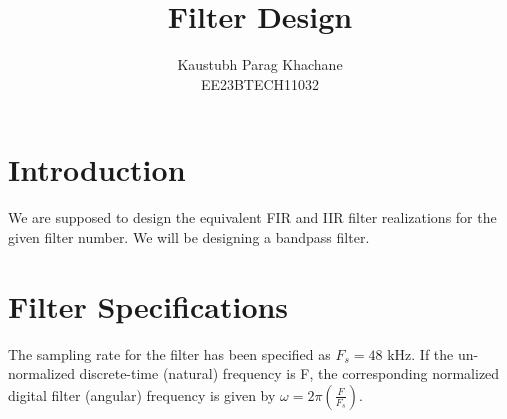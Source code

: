 \documentclass{article}
\begin{document}
\title{ \textbf{Filter Design}}

\author{Kaustubh Parag Khachane\\EE23BTECH11032}
\date{}

\maketitle
\section{Introduction}
We are supposed to design the equivalent FIR and IIR filter realizations for the given filter number.  We will be designing a bandpass filter.

\section{Filter Specifications}
The sampling rate for the filter has been specified as $F_s =  48$ kHz.	If the un-normalized  discrete-time (natural) frequency is F, the corresponding normalized digital filter (angular) frequency is given by $\omega = 2\pi
\left(\frac{F}{F_s}\right)$.
\end{document}
